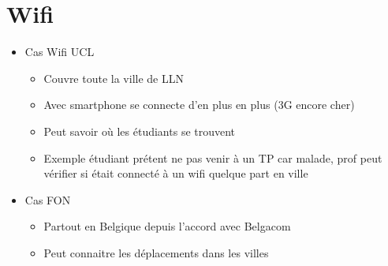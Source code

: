 \section*{Wifi}
\begin{itemize}
\item Cas Wifi UCL
  \begin{itemize}
  \item Couvre toute la ville de LLN
  \item Avec smartphone se connecte d'en plus en plus (3G encore cher)
  \item Peut savoir où les étudiants se trouvent
  \item Exemple étudiant prétent ne pas venir à un TP car malade, prof peut vérifier si était connecté à un wifi quelque part en ville
  \end{itemize}
\item Cas FON
  \begin{itemize}
  \item Partout en Belgique depuis l'accord avec Belgacom
  \item Peut connaitre les déplacements dans les villes
  \end{itemize}

\end{itemize}

